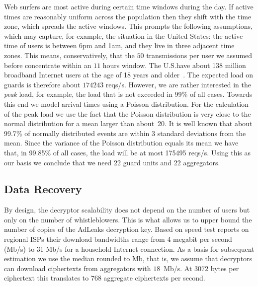 \documentclass[twocolumn,10pt]{article}
\newcommand{\Kads}{50}
\newcommand{\Kclen}{3072}
\newcommand{\Uclen}{bytes}
\newcommand{\Kusers}{138}
\newcommand{\Uusers}{million}
\newcommand{\Khours}{11}
\newcommand{\Kreqi}{174243}
\newcommand{\Ureqi}{reqs/s}
\newcommand{\Ksreqi}{175495}
\newcommand{\Usreqi}{reqs/s}
\newcommand{\Kunitsi}{22}
\newcommand{\Kunitsii}{22}
\newcommand{\Kcapiii}{18}
\newcommand{\Ucapiii}{Mb/s}
\newcommand{\Kpktiii}{768}
\begin{document}
Web surfers are most active during certain time windows during the day.  If
active times are reasonably uniform across the population then they shift
with the time zone, which spreads the active windows.  This prompts the
following assumptions, which may capture, for example, the situation in the
United States: the active time of users is between 6pm and 1am, and they
live in three adjacent time zones.  This means, conservatively, that the
$\Kads$ transmissions per user we assumed before concentrate within an
$\Khours$ hours window. The U.S.\@ have about \Kusers{} \Uusers{} broadband
Internet users at the age of 18 years and older~\cite{Stats2012a}.
The expected load on guards is therefore about $\Kreqi$ \Ureqi{}.  However,
we are rather interested in the \emph{peak} load, for example, the load that
is not exceeded in 99\% of all cases.  Towards this end we model arrival
times using a Poisson distribution.  For the calculation of the peak load we
use the fact that the Poisson distribution is very close to the normal
distribution for a mean larger than about~20.  It is well known that about
99.7\% of normally distributed events are within 3 standard deviations from
the mean.  Since the variance of the Poisson distribution equals its mean we
have that, in 99.85\% of all cases, the load will be at most \Ksreqi{}
\Usreqi.  Using this as our basis we conclude that we need \Kunitsi{} guard
units and \Kunitsii{} aggregators.


\subsection{Data Recovery}
\label{sec:recp}
\label{sec:treedec}

By design, the decryptor scalability does not depend on the number of users
but only on the number of whistleblowers.  This is what allows us to upper
bound the number of copies of the AdLeaks decryption key.  Based on speed
test reports on regional ISPs their download bandwidths range from 4 megabit
per second (Mb/s) to 31 Mb/s for a household Internet connection.  As a
basis for subsequent estimation we use the median rounded to Mb, that is, we
assume that decryptors can download ciphertexts from aggregators with
$\Kcapiii$~\Ucapiii.  At $\Kclen$ \Uclen{} per ciphertext this translates to
$\Kpktiii$ aggregate ciphertexts per second.
\end{document}
